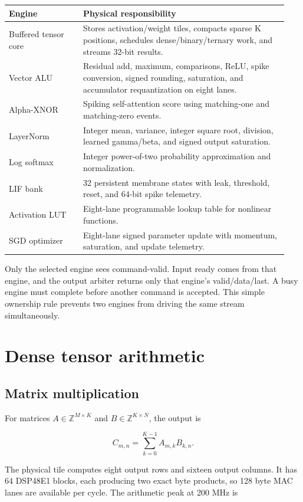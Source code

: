 \documentclass[10pt]{article}
\begin{document}
\begin{longtable}{p{0.25\linewidth}p{0.69\linewidth}}
\toprule
Engine & Physical responsibility\\
\midrule
\endhead
Buffered tensor core & Stores activation/weight tiles, compacts sparse K
positions, schedules dense/binary/ternary work, and streams 32-bit results.\\
Vector ALU & Residual add, maximum, comparisons, ReLU, spike conversion, signed
rounding, saturation, and accumulator requantization on eight lanes.\\
Alpha-XNOR & Spiking self-attention score using matching-one and matching-zero
events.\\
LayerNorm & Integer mean, variance, integer square root, division, learned
gamma/beta, and signed output saturation.\\
Log softmax & Integer power-of-two probability approximation and normalization.\\
LIF bank & 32 persistent membrane states with leak, threshold, reset, and
64-bit spike telemetry.\\
Activation LUT & Eight-lane programmable lookup table for nonlinear functions.\\
SGD optimizer & Eight-lane signed parameter update with momentum, saturation,
and update telemetry.\\
\bottomrule
\end{longtable}

Only the selected engine sees command-valid. Input ready comes from that engine,
and the output arbiter returns only that engine's valid/data/last. A busy engine
must complete before another command is accepted. This simple ownership rule
prevents two engines from driving the same stream simultaneously.

\section{Dense tensor arithmetic}

\subsection{Matrix multiplication}

For matrices $A\in\mathbb{Z}^{M\times K}$ and
$B\in\mathbb{Z}^{K\times N}$, the output is

\[
  C_{m,n}=\sum_{k=0}^{K-1} A_{m,k}B_{k,n}.
\]

The physical tile computes eight output rows and sixteen output columns. It has
64 DSP48E1 blocks, each producing two exact byte products, so 128 byte MAC
lanes are available per cycle. The arithmetic peak at 200 MHz is
\end{document}
